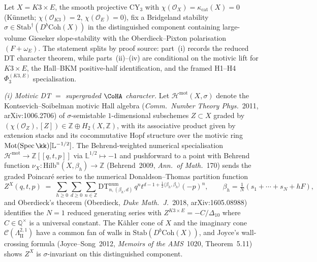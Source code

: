 \begin{theorem}
\label{thm:qgf-motivic-dt-coha-phi3-gDelta5}
Let $X = K3\times E$, the smooth projective $\mathrm{CY}_3$ with
$\chi(\mathcal O_X)=\kappa_{\mathrm{cat}}(X)=0$
(K\"unneth; $\chi(\mathcal O_{K3})=2$, $\chi(\mathcal O_E)=0$), fix a
Bridgeland stability $\sigma\in\mathrm{Stab}^\dagger(D^b\mathrm{Coh}(X))$
in the distinguished component containing large-volume Gieseker
slope-stability with the Oberdieck--Pixton polarisation $(F+\omega_E)$.
The statement splits by proof source: part~\textup{(i)} records the
reduced DT character theorem, while parts~\textup{(ii)}--\textup{(iv)}
are conditional on the motivic lift for $K3\times E$, the Hall--BKM
positive-half identification, and the framed H1--H4
$\Phi_3^{(K3,E)}$ specialisation.

\medskip

\emph{(i) Motivic DT $=$ supergraded $\CoHA$ character.} Let
$\mathcal H^{\mathrm{mot}}(X,\sigma)$ denote the Kontsevich--Soibelman
motivic Hall algebra
(\emph{Comm.\ Number Theory Phys.}\ 2011, arXiv:1006.2706) of
$\sigma$-semistable $1$-dimensional subschemes $Z\subset X$ graded by
$(\chi(\mathcal O_Z),[Z])\in\mathbb Z\oplus H_2(X,\mathbb Z)$,
with its associative product given by extension stacks and its
cocommutative Hopf structure over the motivic ring
$\mathrm{Mot}(\mathrm{Spec}\,\kk)[\mathbb L^{-1/2}]$. The Behrend-weighted
numerical specialisation
$\mathcal H^{\mathrm{mot}}\to\mathbb Z[\![q,t,p]\!]$
via $\mathbb L^{1/2}\mapsto -1$ and pushforward to a point with Behrend
function $\nu_X\colon\mathrm{Hilb}^n(X,\beta_h)\to\mathbb Z$
(Behrend~2009, \emph{Ann.\ of Math.}~170) sends the graded Poincar\'e
series to the numerical Donaldson--Thomas partition function
\[
 Z^X(q,t,p) \;=\; \sum_{h\geq 0}\sum_{d\geq 0}\sum_{n\in\mathbb Z}
 \mathrm{DT}^{\mathrm{num}}_{n,(\beta_h,d)}\, q^n t^{d-1+\frac{1}{2}
 \langle\beta_h,\beta_h\rangle} (-p)^n,
 \qquad
 \beta_h=\tfrac{1}{N}(s_1+\cdots+s_N+hF),
\]
and Oberdieck's theorem (Oberdieck, \emph{Duke Math.\ J.}~2018,
arXiv:1605.08988) identifies the $N=1$ reduced generating series with
$Z^{K3\times E} = -C/\Delta_{10}$ where $C\in\mathbb Q^\times$ is a
universal constant. The K\"ahler cone of $X$ and the imaginary cone
$\mathcal C(\Lambda_{\mathrm{II}}^{2,1})$ have a common fan of walls in
$\mathrm{Stab}(D^b\mathrm{Coh}(X))$, and Joyce's wall-crossing formula
(Joyce--Song~2012, \emph{Memoirs of the AMS}~1020, Theorem~5.11) shows
$Z^X$ is $\sigma$-invariant on this distinguished component.


\end{theorem}

